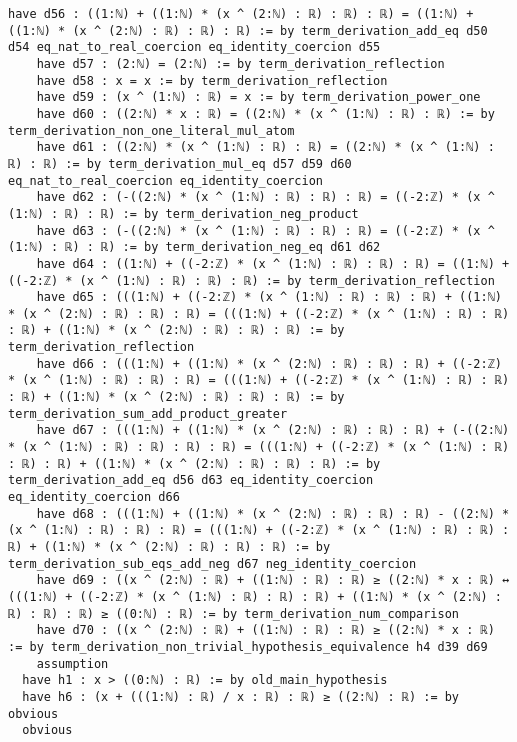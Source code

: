 \documentclass{article}
\begin{document}
\begin{tcolorbox}[colback=white!10, width=\linewidth]
\begin{lstlisting}[language=Lean4]
    have d56 : ((1:ℕ) + ((1:ℕ) * (x ^ (2:ℕ) : ℝ) : ℝ) : ℝ) = ((1:ℕ) + ((1:ℕ) * (x ^ (2:ℕ) : ℝ) : ℝ) : ℝ) := by term_derivation_add_eq d50 d54 eq_nat_to_real_coercion eq_identity_coercion d55
    have d57 : (2:ℕ) = (2:ℕ) := by term_derivation_reflection
    have d58 : x = x := by term_derivation_reflection
    have d59 : (x ^ (1:ℕ) : ℝ) = x := by term_derivation_power_one
    have d60 : ((2:ℕ) * x : ℝ) = ((2:ℕ) * (x ^ (1:ℕ) : ℝ) : ℝ) := by term_derivation_non_one_literal_mul_atom
    have d61 : ((2:ℕ) * (x ^ (1:ℕ) : ℝ) : ℝ) = ((2:ℕ) * (x ^ (1:ℕ) : ℝ) : ℝ) := by term_derivation_mul_eq d57 d59 d60 eq_nat_to_real_coercion eq_identity_coercion
    have d62 : (-((2:ℕ) * (x ^ (1:ℕ) : ℝ) : ℝ) : ℝ) = ((-2:ℤ) * (x ^ (1:ℕ) : ℝ) : ℝ) := by term_derivation_neg_product
    have d63 : (-((2:ℕ) * (x ^ (1:ℕ) : ℝ) : ℝ) : ℝ) = ((-2:ℤ) * (x ^ (1:ℕ) : ℝ) : ℝ) := by term_derivation_neg_eq d61 d62
    have d64 : ((1:ℕ) + ((-2:ℤ) * (x ^ (1:ℕ) : ℝ) : ℝ) : ℝ) = ((1:ℕ) + ((-2:ℤ) * (x ^ (1:ℕ) : ℝ) : ℝ) : ℝ) := by term_derivation_reflection
    have d65 : (((1:ℕ) + ((-2:ℤ) * (x ^ (1:ℕ) : ℝ) : ℝ) : ℝ) + ((1:ℕ) * (x ^ (2:ℕ) : ℝ) : ℝ) : ℝ) = (((1:ℕ) + ((-2:ℤ) * (x ^ (1:ℕ) : ℝ) : ℝ) : ℝ) + ((1:ℕ) * (x ^ (2:ℕ) : ℝ) : ℝ) : ℝ) := by term_derivation_reflection
    have d66 : (((1:ℕ) + ((1:ℕ) * (x ^ (2:ℕ) : ℝ) : ℝ) : ℝ) + ((-2:ℤ) * (x ^ (1:ℕ) : ℝ) : ℝ) : ℝ) = (((1:ℕ) + ((-2:ℤ) * (x ^ (1:ℕ) : ℝ) : ℝ) : ℝ) + ((1:ℕ) * (x ^ (2:ℕ) : ℝ) : ℝ) : ℝ) := by term_derivation_sum_add_product_greater
    have d67 : (((1:ℕ) + ((1:ℕ) * (x ^ (2:ℕ) : ℝ) : ℝ) : ℝ) + (-((2:ℕ) * (x ^ (1:ℕ) : ℝ) : ℝ) : ℝ) : ℝ) = (((1:ℕ) + ((-2:ℤ) * (x ^ (1:ℕ) : ℝ) : ℝ) : ℝ) + ((1:ℕ) * (x ^ (2:ℕ) : ℝ) : ℝ) : ℝ) := by term_derivation_add_eq d56 d63 eq_identity_coercion eq_identity_coercion d66
    have d68 : (((1:ℕ) + ((1:ℕ) * (x ^ (2:ℕ) : ℝ) : ℝ) : ℝ) - ((2:ℕ) * (x ^ (1:ℕ) : ℝ) : ℝ) : ℝ) = (((1:ℕ) + ((-2:ℤ) * (x ^ (1:ℕ) : ℝ) : ℝ) : ℝ) + ((1:ℕ) * (x ^ (2:ℕ) : ℝ) : ℝ) : ℝ) := by term_derivation_sub_eqs_add_neg d67 neg_identity_coercion
    have d69 : ((x ^ (2:ℕ) : ℝ) + ((1:ℕ) : ℝ) : ℝ) ≥ ((2:ℕ) * x : ℝ) ↔ (((1:ℕ) + ((-2:ℤ) * (x ^ (1:ℕ) : ℝ) : ℝ) : ℝ) + ((1:ℕ) * (x ^ (2:ℕ) : ℝ) : ℝ) : ℝ) ≥ ((0:ℕ) : ℝ) := by term_derivation_num_comparison
    have d70 : ((x ^ (2:ℕ) : ℝ) + ((1:ℕ) : ℝ) : ℝ) ≥ ((2:ℕ) * x : ℝ) := by term_derivation_non_trivial_hypothesis_equivalence h4 d39 d69
    assumption
  have h1 : x > ((0:ℕ) : ℝ) := by old_main_hypothesis
  have h6 : (x + (((1:ℕ) : ℝ) / x : ℝ) : ℝ) ≥ ((2:ℕ) : ℝ) := by obvious
  obvious

\end{lstlisting}
\end{tcolorbox}
\end{document}
